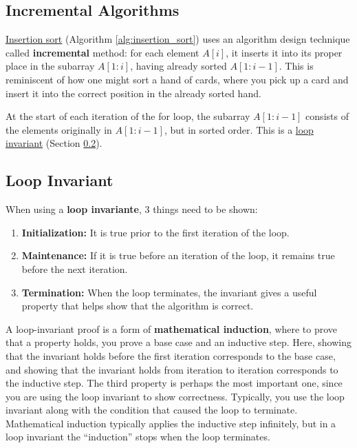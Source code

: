 \subsection{Incremental Algorithms}
\label{sec:incremental_algorithms}
\begin{example}
    \label{ex:insertion_sort}
    \hyperref[sec:insertion_sort]{Insertion sort} (Algorithm \ref{alg:insertion_sort}) uses an algorithm design technique called \textbf{incremental} method: for each element $A[i]$, it inserts it into its proper place in the subarray $A[1:i]$, having already sorted $A[1:i-1]$.
    This is reminiscent of how one might sort a hand of cards, where you pick up a card and insert it into the correct position in the already sorted hand.
    
    At the start of each iteration of the for loop, the subarray $A[1:i-1]$ consists of the elements originally in $A[1:i-1]$, but in sorted order.
    This is a \hyperref[sec:loop_invariant]{loop invariant} (Section \ref{sec:loop_invariant}).
\end{example}

\subsection{Loop Invariant}
\label{sec:loop_invariant}
When using a \textbf{loop invariante}, 3 things need to be shown:
\begin{enumerate}
\item \textbf{Initialization:} It is true prior to the first iteration of the loop.
\item \textbf{Maintenance:} If it is true before an iteration of the loop, it remains true before the next iteration.
\item \textbf{Termination:} When the loop terminates, the invariant gives a useful property that helps show that the algorithm is correct.
\end{enumerate}


A loop-invariant proof is a form of \textbf{mathematical induction}, where to prove that a property holds, you prove a base case and an inductive step.
Here, showing that the invariant holds before the first iteration corresponds to the base case, and showing that the invariant holds from iteration to iteration corresponds to the inductive step.
The third property is perhaps the most important one, since you are using the loop invariant to show correctness. 
Typically, you use the loop invariant along with the condition that caused the loop to terminate. 
Mathematical induction typically applies the inductive step infinitely, but in a loop invariant the ``induction'' stops when the loop terminates.



